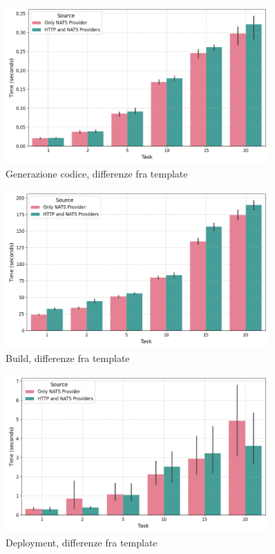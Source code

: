 \FloatBarrier
\begin{figure}[ht!]
    \centering
    \includegraphics[width=0.9\textwidth]{img/plots/gen_time_providers_barplot.png}
    \caption{Generazione codice, differenze fra template}
    \label{fig:test_provider_gen}
\end{figure}
\FloatBarrier

\FloatBarrier
\begin{figure}[ht!]
    \centering
    \includegraphics[width=0.9\textwidth]{img/plots/build_time_providers_barplot.png}
    \caption{Build, differenze fra template}
    \label{fig:test_provider_build}
\end{figure}
\FloatBarrier

\FloatBarrier
\begin{figure}[ht!]
    \centering
    \includegraphics[width=0.9\textwidth]{img/plots/deploy_time_providers_barplot.png}
    \caption{Deployment, differenze fra template}
    \label{fig:test_provider_deploy}
\end{figure}
\FloatBarrier

